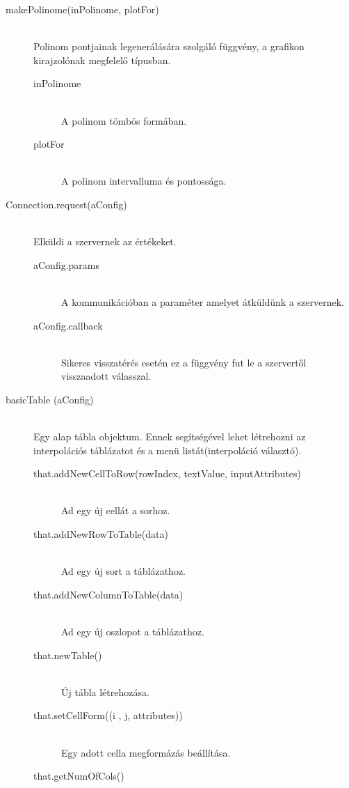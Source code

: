 	\begin{description}
		\item[makePolinome(inPolinome, plotFor)] \hfill \\ 
			Polinom pontjainak legenerálására szolgáló függvény, a grafikon kirajzolónak megfelelő típusban.
			\begin{description}
				\item[inPolinome] \hfill \\ 
					A polinom tömbös formában.
				\item[plotFor] \hfill \\ 
					A polinom intervalluma és pontossága.
			\end{description}
		\item[Connection.request(aConfig)] \hfill \\ 
			Elküldi a szervernek az értékeket.
			\begin{description}
				\item[aConfig.params] \hfill \\
				A kommunikációban a paraméter amelyet átküldünk a szervernek.
				\item[aConfig.callback] \hfill \\
				Sikeres visszatérés esetén ez a függvény fut le a szervertől visszaadott válasszal. 
			\end{description}
		\item[basicTable (aConfig)] \hfill \\ 
			Egy alap tábla objektum. Ennek segítségével lehet létrehozni az interpolációs táblázatot és a menü listát(interpoláció választó).
			\begin{description}
			\item[that.addNewCellToRow(rowIndex, textValue, inputAttributes)] 
				\hfill \\  Ad egy új cellát a sorhoz.
			\item[that.addNewRowToTable(data)]
				\hfill \\ Ad egy új sort a táblázathoz.
			\item[that.addNewColumnToTable(data)]
				\hfill \\ Ad egy új oszlopot a táblázathoz.
			\item[that.newTable()] 
				\hfill \\ Új tábla létrehozása.
			\item[that.setCellForm((i , j, attributes))] 
				\hfill \\ Egy adott cella megformázás beállítása.
			\item[that.getNumOfCols()] 

\end{description}
\end{description}

